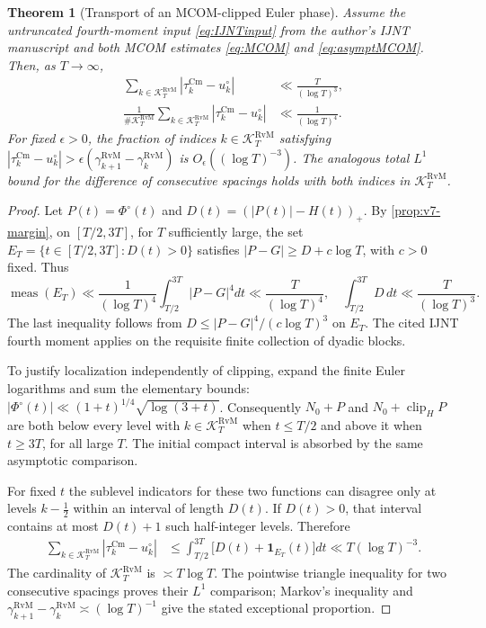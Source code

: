 \documentclass[11pt,a4paper]{article}
\numberwithin{equation}{section}
\newtheorem{theorem}{Theorem}[section]
\theoremstyle{definition}
\theoremstyle{remark}
\newcommand{\meas}{\operatorname{meas}}
\newcommand{\clip}{\operatorname{clip}}
\newcommand{\Cm}{\mathrm{Cm}}
\begin{document}
\begin{theorem}[Transport of an MCOM-clipped Euler phase]
\label{thm:v7-transport}
Assume the untruncated fourth-moment input \eqref{eq:IJNTinput}
from the author's IJNT manuscript and both MCOM estimates
\eqref{eq:MCOM} and \eqref{eq:asymptMCOM}. Then, as $T\to\infty$,
\begin{align}
 \sum_{k\in\mathcal K_T^{\mathrm{RvM}}}|\tau_k^{\Cm}-u_k^\circ|
 &\ll\frac{T}{(\log T)^3},\label{eq:v7-transport}\\
 \frac1{\#\mathcal K_T^{\mathrm{RvM}}}\sum_{k\in\mathcal K_T^{\mathrm{RvM}}}
 |\tau_k^{\Cm}-u_k^\circ|
 &\ll\frac1{(\log T)^4}.\label{eq:v7-transport-avg}
\end{align}
For fixed $\epsilon>0$, the fraction of indices $k\in\mathcal K_T^{\mathrm{RvM}}$ satisfying
$|\tau_k^{\Cm}-u_k^\circ|>
\epsilon(\gamma_{k+1}^{\mathrm{RvM}}-
\gamma_k^{\mathrm{RvM}})$ is
$O_\epsilon((\log T)^{-3})$.
The analogous total $L^1$ bound for the difference of consecutive
spacings holds with both indices in $\mathcal K_T^{\mathrm{RvM}}$.
\end{theorem}
\begin{proof}
Let $P(t)=\Phi^\circ(t)$ and
$D(t)=(|P(t)|-H(t))_+$.
By \cref{prop:v7-margin}, on $[T/2,3T]$, for $T$ sufficiently
large, the set $E_T=\{t\in[T/2,3T]:D(t)>0\}$ satisfies
$|P-G|\ge D+c\log T$, with $c>0$ fixed. Thus
\begin{equation}\label{eq:v7-local-D}
 \meas(E_T)\ll\frac{1}{(\log T)^4}
 \int_{T/2}^{3T}|P-G|^4dt\ll\frac{T}{(\log T)^4},
 \quad
 \int_{T/2}^{3T}D\,dt\ll\frac{T}{(\log T)^3}.
\end{equation}
The last inequality follows from
$D\le |P-G|^4/(c\log T)^3$ on $E_T$.
The cited IJNT fourth moment applies on the requisite finite
collection of dyadic blocks.

To justify localization independently of clipping, expand the finite
Euler logarithms and sum the elementary bounds:
$|\Phi^\circ(t)|\ll (1+t)^{1/4}\sqrt{\log(3+t)}$.
Consequently $N_0+P$ and $N_0+\clip_H P$ are both below every
level with $k\in\mathcal K_T^{\mathrm{RvM}}$ when $t\le T/2$ and above it when
$t\ge3T$, for all large $T$. The initial compact interval is
absorbed by the same asymptotic comparison.

For fixed $t$ the sublevel indicators for these two functions
can disagree only at levels $k-\frac12$ within an interval of
length $D(t)$. If $D(t)>0$, that interval contains at most
$D(t)+1$ such half-integer levels. Therefore
\begin{align}
\sum_{k\in\mathcal K_T^{\mathrm{RvM}}}|\tau_k^{\Cm}-u_k^\circ|
&\le\int_{T/2}^{3T}
\bigl[D(t)+\mathbf1_{E_T}(t)\bigr]dt
\ll T(\log T)^{-3}.
\end{align}
The cardinality of $\mathcal K_T^{\mathrm{RvM}}$ is $\asymp T\log T$.
The pointwise triangle inequality for two consecutive
spacings proves their $L^1$ comparison; Markov's inequality and
$\gamma_{k+1}^{\mathrm{RvM}}-
\gamma_k^{\mathrm{RvM}}\asymp(\log T)^{-1}$
give the stated exceptional proportion.
\end{proof}
\end{document}
